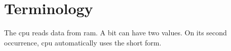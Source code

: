 \documentclass[english]{../../../unipd-notes}
\begin{document}
\tableofcontents
\chapter{Terminology}
The \gls{cpu} reads data from \gls{ram}. A \gls{bit} can have two values.
On its second occurrence, \gls{cpu} automatically uses the short form.
\printcourseglossary
\end{document}
